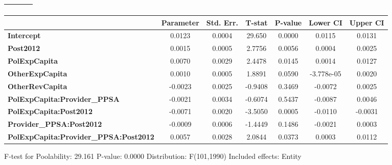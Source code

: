 \begin{center}
\begin{tabular}{lclc}
\textbf{}                                     &                    & \textbf{                     }   &                  \\
\bottomrule
\end{tabular}
\begin{tabular}{lcccccc}
                                              & \textbf{Parameter} & \textbf{Std. Err.} & \textbf{T-stat} & \textbf{P-value} & \textbf{Lower CI} & \textbf{Upper CI}  \\
\midrule
\textbf{Intercept}                            &       0.0123       &       0.0004       &      29.650     &      0.0000      &       0.0115      &       0.0131       \\
\textbf{Post2012}                             &       0.0015       &       0.0005       &      2.7756     &      0.0056      &       0.0004      &       0.0025       \\
\textbf{PolExpCapita}                         &       0.0070       &       0.0029       &      2.4478     &      0.0145      &       0.0014      &       0.0127       \\
\textbf{OtherExpCapita}                       &       0.0010       &       0.0005       &      1.8891     &      0.0590      &     -3.778e-05    &       0.0020       \\
\textbf{OtherRevCapita}                       &      -0.0023       &       0.0025       &     -0.9408     &      0.3469      &      -0.0072      &       0.0025       \\
\textbf{PolExpCapita:Provider\_PPSA}          &      -0.0021       &       0.0034       &     -0.6074     &      0.5437      &      -0.0087      &       0.0046       \\
\textbf{PolExpCapita:Post2012}                &      -0.0071       &       0.0020       &     -3.5050     &      0.0005      &      -0.0110      &      -0.0031       \\
\textbf{Provider\_PPSA:Post2012}              &      -0.0009       &       0.0006       &     -1.4449     &      0.1486      &      -0.0021      &       0.0003       \\
\textbf{PolExpCapita:Provider\_PPSA:Post2012} &       0.0057       &       0.0028       &      2.0844     &      0.0373      &       0.0003      &       0.0112       \\
\bottomrule
\end{tabular}
\end{center}

F-test for Poolability: 29.161 \newline
 P-value: 0.0000 \newline
 Distribution: F(101,1990) \newline
  \newline
 Included effects: Entity